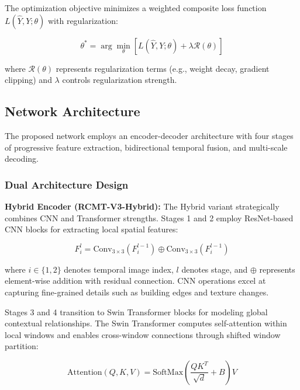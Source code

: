 \documentclass[journal]{IEEEtran}
\begin{document}
{The optimization objective minimizes a weighted composite loss function $L(\hat{Y}, Y; \theta)$ with regularization:

\begin{equation}
\theta^* = \arg\min_\theta \left[ L(\hat{Y}, Y; \theta) + \lambda \mathcal{R}(\theta) \right]
\label{eq:objective}
\end{equation}

where $\mathcal{R}(\theta)$ represents regularization terms (e.g., weight decay, gradient clipping) and $\lambda$ controls regularization strength.

\subsection{Network Architecture}

The proposed network employs an encoder-decoder architecture with four stages of progressive feature extraction, bidirectional temporal fusion, and multi-scale decoding.

\subsubsection{Dual Architecture Design}

\textbf{Hybrid Encoder (RCMT-V3-Hybrid):} The Hybrid variant strategically combines CNN and Transformer strengths. Stages 1 and 2 employ ResNet-based CNN blocks for extracting local spatial features:

\begin{equation}
F_i^l = \text{Conv}_{3\times 3}(F_{i}^{l-1}) \oplus \text{Conv}_{3\times 3}(F_{i}^{l-1})
\label{eq:cnn}
\end{equation}

where $i \in \{1,2\}$ denotes temporal image index, $l$ denotes stage, and $\oplus$ represents element-wise addition with residual connection. CNN operations excel at capturing fine-grained details such as building edges and texture changes.

Stages 3 and 4 transition to Swin Transformer blocks for modeling global contextual relationships. The Swin Transformer computes self-attention within local windows and enables cross-window connections through shifted window partition:

\begin{equation}
\text{Attention}(Q, K, V) = \text{SoftMax}\left(\frac{QK^T}{\sqrt{d}} + B\right)V
\label{eq:attention}
\end{equation}

}
\end{document}
